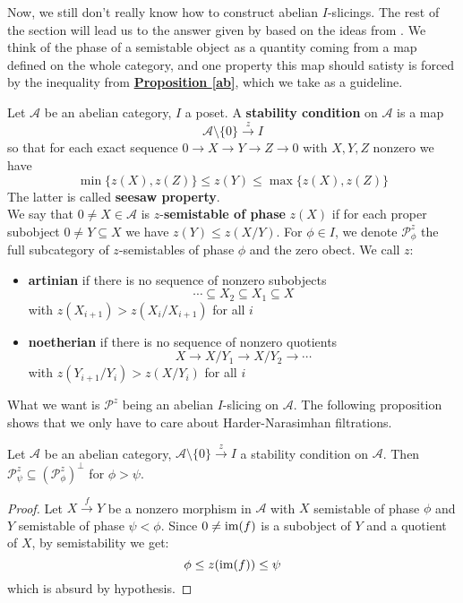 Now, we still don't really know how to construct abelian $I$-slicings. The rest of the section will lead us to the answer given by \cite{joy} based on the ideas from \cite{rud}. We think of the phase of a semistable object as a quantity coming from a map defined on the whole category, and one property this map should satisty is forced by the inequality from \hyperref[ab]{\textbf{Proposition \ref*{ab}}}, which we take as a guideline.\\

\begin{defn}
Let $\mathscr{A}$ be an abelian category, $I$ a poset. A \textbf{stability condition} on $\mathscr{A}$ is a map $$\mathscr{A} \setminus \{ 0 \} \overset{z}{\longrightarrow} I$$ 
so that for each exact sequence $0 \longrightarrow X \longrightarrow Y \longrightarrow Z \longrightarrow 0$ with $X,Y,Z$ nonzero we have  
 $$\min \{ z(X), z(Z) \} \le z(Y) \le \max \{ z(X), z(Z) \}$$ 
The latter is called \textbf{seesaw property}. \\
We say that $0 \not =X \in \mathscr{A}$ is $z$-\textbf{semistable of phase} $z(X)$ if for each proper subobject $0 \not = Y \subseteq X$ we have $z(Y) \le z(X/Y)$.  For $\phi \in I$, we denote $\mathscr{P}_{\phi}^z$ the full subcategory of $z$-semistables of phase $\phi$ and the zero obect.  We call $z$: 
\begin{itemize}
\item \textbf{artinian} if there is no sequence of nonzero subobjects $$\cdots \subseteq X_2 \subseteq X_1 \subseteq X$$
with $z(X_{i+1})>z(X_i/X_{i+1})$ for all $i$
\item \textbf{noetherian} if there is no sequence of nonzero quotients $$X \longrightarrow X/Y_1 \longrightarrow X/Y_2 \longrightarrow \cdots$$ with $z(Y_{i+1}/Y_i)>z(X/Y_i)$ for all $i$
\end{itemize}
\end{defn}

What we want is $\mathscr{P}^z$ being an abelian $I$-slicing on $\mathscr{A}$. The following proposition shows that we only have to care about Harder-Narasimhan filtrations. 

\begin{prop}\label{giek}
  Let $\mathscr{A}$ be an abelian category, $\mathscr{A} \setminus \{ 0 \} \overset{z}{\longrightarrow} I$ a stability condition on $\mathscr{A}$. Then $\mathscr{P}_{\psi}^z \subseteq (\mathscr{P}_{\phi}^z)^{\perp}$ for $\phi > \psi$.
\end{prop}

\begin{proof}
  Let $X \overset{f}{\longrightarrow} Y$ be a nonzero morphism in $\mathscr{A}$ with $X$ semistable of phase $\phi$ and $Y$ semistable of phase $\psi < \phi$. Since $0 \not = \textnormal{im}(f)$ is a subobject of $Y$ and a quotient of $X$, by semistability we get: $$\phi \le z(\textnormal{im}(f)) \le \psi$$ which is absurd by hypothesis. 
\end{proof}

